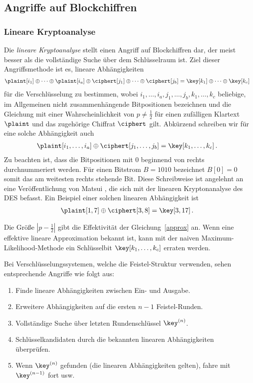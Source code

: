 \subsection{Angriffe auf Blockchiffren}
\subsubsection{Lineare Kryptoanalyse}\label{sssec:linKryptoanalyse}
Die \emph{lineare Kryptoanalyse} stellt einen Angriff auf Blockchiffren dar, der meist besser als die vollständige Suche über dem Schlüsselraum ist. Ziel dieser Angriffsmethode ist es, lineare Abhängigkeiten
\begin{align}\label{approx}
	\plaint[i_{1}] \oplus \dots \oplus \plaint[i_{a}] \oplus \ciphert[j_{1}] \oplus \dots \oplus \ciphert[j_{b}] = \key[k_{1}] \oplus \dots \oplus \key[k_{c}]
\end{align}
für die Verschlüsselung zu bestimmen, wobei $i_{1},\dots,i_{a},j_{1},\dots,j_{b},k_{1},\dots,k_{c}$ beliebige, im Allgemeinen nicht zusammenhängende Bitpositionen bezeichnen und die Gleichung mit einer Wahrscheinlichkeit von $p \neq \frac{1}{2}$ für einen zufälligen Klartext $\plaint$ und das zugehörige Chiffrat $\ciphert$ gilt. Abkürzend schreiben wir für eine solche Abhängigkeit auch
\begin{align*}
	\plaint[i_{1},\dots,i_{a}] \oplus \ciphert[j_{1},\dots,j_{b}] = \key[k_{1},\dots,k_{c}]\, .
\end{align*}
Zu beachten ist, dass die Bitpositionen mit $0$ beginnend von rechts durchnummeriert werden.
\label{matsui-notation}Für einen Bitstrom $B = 1010$ bezeichnet $B[0] = 0$ somit das am weitesten rechts stehende Bit. Diese Schreibweise ist angelehnt an eine Veröffentlichung von Matsui \cite{Matsui1994}, die sich mit der linearen Kryptonanalyse des DES befasst.
Ein Beispiel einer solchen linearen Abhängigkeit ist
\begin{align*}
	\plaint[1, 7] \oplus \ciphert[3, 8] = \key[3, 17]\, .
\end{align*}

Die Größe $\left|{p-\frac{1}{2}}\right|$ gibt die Effektivität der Gleichung~\ref{approx} an. Wenn eine effektive lineare Approximation bekannt ist, kann mit der naiven Maximum-Likelihood-Methode ein Schlüsselbit $\key[k_1,\dots, k_c]$ erraten werden. %

Bei Verschlüsselungssystemen, welche die Feistel-Struktur verwenden, sehen entsprechende Angriffe wie folgt aus:
\begin{enumerate}
	\item Finde lineare Abhängigkeiten zwischen Ein- und Ausgabe.
	\item Erweitere Abhängigkeiten auf die ersten $n-1$ Feistel-Runden.
	\item Vollständige Suche über letzten Rundenschlüssel $\key^{(n)}$.
	\item Schlüsselkandidaten durch die bekannten linearen Abhängigkeiten überprüfen.
	\item Wenn $\key^{(n)}$ gefunden (\dh die linearen Abhängigkeiten gelten), fahre mit $\key^{(n-1)}$ fort usw.
\end{enumerate}

